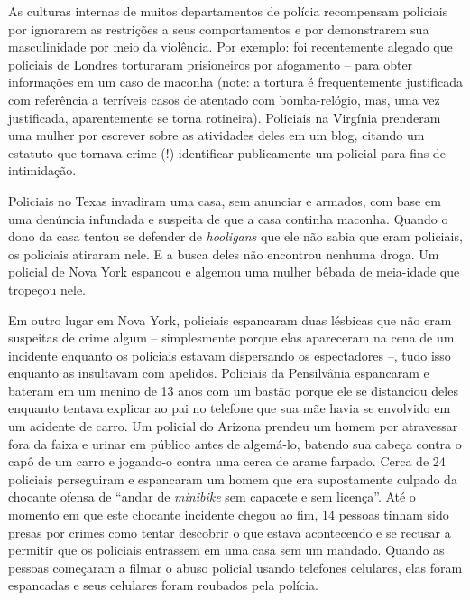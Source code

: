 As culturas internas de muitos departamentos de polícia recompensam policiais por ignorarem as restrições a seus comportamentos e por demonstrarem sua masculinidade por meio da violência. Por exemplo: foi recentemente alegado que policiais de Londres torturaram prisioneiros por afogamento -- para obter informações em um caso de maconha (note: a tortura é frequentemente justificada com referência a terríveis casos de atentado com bomba-relógio, mas, uma vez justificada, aparentemente se torna rotineira). Policiais na Virgínia prenderam uma mulher por escrever sobre as atividades deles em um blog, citando um estatuto que tornava crime (!) identificar publicamente um policial para fins de intimidação.

Policiais no Texas invadiram uma casa, sem anunciar e armados, com base em uma denúncia infundada e suspeita de que a casa continha maconha. Quando o dono da casa tentou se defender de \emph{hooligans} que ele não sabia que eram policiais, os policiais atiraram nele. E a busca deles não encontrou nenhuma droga. Um policial de Nova York espancou e algemou uma mulher bêbada de meia-idade que tropeçou nele.

Em outro lugar em Nova York, policiais espancaram duas lésbicas que não eram suspeitas de crime algum -- simplesmente porque elas apareceram na cena de um incidente enquanto os policiais estavam dispersando os espectadores --, tudo isso enquanto as insultavam com apelidos. Policiais da Pensilvânia espancaram e bateram em um menino de 13 anos com um bastão porque ele se distanciou deles enquanto tentava explicar ao pai no telefone que sua mãe havia se envolvido em um acidente de carro. Um policial do Arizona prendeu um homem por atravessar fora da faixa e urinar em público antes de algemá-lo, batendo sua cabeça contra o capô de um carro e jogando-o contra uma cerca de arame farpado. Cerca de 24 policiais perseguiram e espancaram um homem que era supostamente culpado da chocante ofensa de ``andar de \emph{minibike} sem capacete e sem licença''. Até o momento em que este chocante incidente chegou ao fim, 14 pessoas tinham sido presas por crimes como tentar descobrir o que estava acontecendo e se recusar a permitir que os policiais entrassem em uma casa sem um mandado. Quando as pessoas começaram a filmar o abuso policial usando telefones celulares, elas foram espancadas e seus celulares foram roubados pela polícia.

